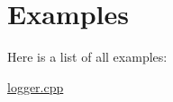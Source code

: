 \section{Examples}
Here is a list of all examples\+:\begin{DoxyCompactItemize}
\item 
\mbox{\hyperlink{logger_8cpp-example}{logger.\+cpp}}
\end{DoxyCompactItemize}
